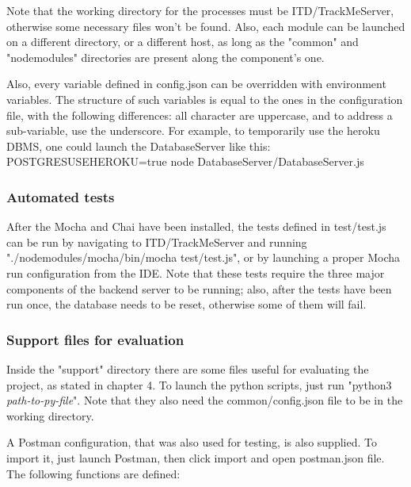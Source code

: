 \documentclass[../main.tex]{subfiles}
\begin{document}
Note that the working directory for the processes must be ITD/TrackMeServer, otherwise some necessary files won't be found. Also, each module can be launched on a different directory, or a different host, as long as the "common" and "node\textunderscore modules" directories are present along the component's one.

Also, every variable defined in config.json can be overridden with environment variables. The structure of such variables is equal to the ones in the configuration file, with the following differences: all character are uppercase, and to address a sub-variable, use the underscore. For example, to temporarily use the heroku DBMS, one could launch the DatabaseServer like this:\newline
POSTGRES\textunderscore USEHEROKU=true node DatabaseServer/DatabaseServer.js

\subsubsection{Automated tests}
After the Mocha and Chai have been installed, the tests defined in test/test.js can be run by navigating to ITD/TrackMeServer and running "./node\textunderscore modules/mocha/bin/mocha test/test.js", or by launching a proper Mocha run configuration from the IDE. Note that these tests require the three major components of the backend server to be running; also, after the tests have been run once, the database needs to be reset, otherwise some of them will fail.

\subsubsection{Support files for evaluation}

Inside the "support" directory there are some files useful for evaluating the project, as stated in chapter 4. To launch the python scripts, just run "python3 \textit{path-to-py-file}". Note that they also need the common/config.json file to be in the working directory.

A Postman configuration, that was also used for testing, is also supplied. To import it, just launch Postman, then click import and open postman.json file. The following functions are defined: \newline
\end{document}
